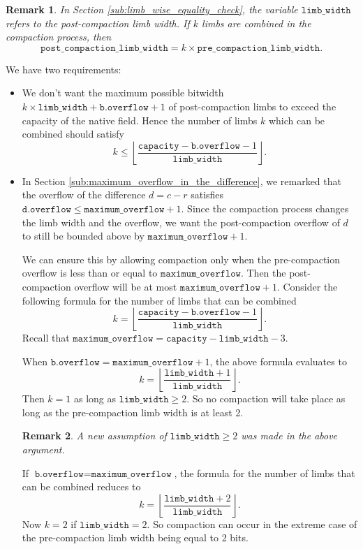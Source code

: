 \documentclass[a4paper, 12pt]{article}
\newtheorem*{remark}{Remark}
\begin{document}
\begin{remark}
  In Section \ref{sub:limb_wise_equality_check}, the variable $\texttt{limb\_width}$ refers to the post-compaction limb width. If $k$ limbs are combined in the compaction process, then $$\texttt{post\_compaction\_limb\_width} = k \times \texttt{pre\_compaction\_limb\_width}.$$
\end{remark}


We have two requirements:
\begin{itemize}
  \item We don't want the maximum possible bitwidth $k\times \texttt{limb\_width} + \texttt{b.overflow} + 1$ of post-compaction limbs to exceed the capacity of the native field. Hence the number of limbs $k$ which can be combined should satisfy
    $$
    k \le \left\lfloor \frac{\texttt{capacity}-\texttt{b.overflow}-1}{\texttt{limb\_width}}\right\rfloor.
    $$

  \item In Section \ref{sub:maximum_overflow_in_the_difference}, we remarked that the overflow of the difference $d = c-r$ satisfies $\texttt{d.overflow} \le \texttt{maximum\_overflow} + 1$. Since the compaction process changes the limb width and the overflow, we want the post-compaction overflow of $d$ to still be bounded above by $\texttt{maximum\_overflow} + 1$.

    We can ensure this by allowing compaction only when the pre-compaction overflow is less than or equal to $\texttt{maximum\_overflow}$. Then the post-compaction overflow will be at most $\texttt{maximum\_overflow} + 1$. Consider the following formula for the number of limbs that can be combined
    $$
    k = \left\lfloor \frac{\texttt{capacity}-\texttt{b.overflow}- 1}{\texttt{limb\_width}}\right\rfloor.
    $$
    Recall that $\texttt{maximum\_overflow}= \texttt{capacity} - \texttt{limb\_width} - 3$.

    When $\texttt{b.overflow} = \texttt{maximum\_overflow} + 1$, the above formula evaluates to
    $$
    k = \left\lfloor \frac{\texttt{limb\_width}+ 1}{\texttt{limb\_width}}\right\rfloor.
    $$
    Then $k = 1$ as long as $\texttt{limb\_width} \ge 2$. So no compaction will take place as long as the pre-compaction limb width is at least 2.
    \begin{remark}
    A new assumption of $\texttt{limb\_width} \ge 2$ was made in the above argument.
    \end{remark}

    If $\texttt{b.overflow} = \texttt{maximum\_overflow}$, the formula for the number of limbs that can be combined reduces to
    $$
    k = \left\lfloor \frac{\texttt{limb\_width}+ 2}{\texttt{limb\_width}}\right\rfloor.
    $$
    Now $k=2$ if $\texttt{limb\_width} = 2$. So compaction can occur in the extreme case of the pre-compaction limb width being equal to 2 bits.
\end{itemize}
\end{document}

